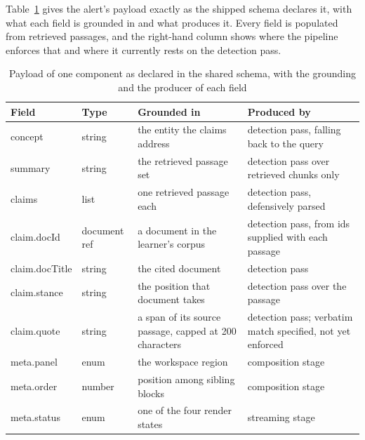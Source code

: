\documentclass[conference]{IEEEtran}
\newcommand{\tbl}{\footnotesize}
\begin{document}
Table~\ref{tab:payload} gives the alert's payload exactly as the shipped schema declares it, with what each field is grounded in and what produces it. Every field is populated from retrieved passages, and the right-hand column shows where the pipeline enforces that and where it currently rests on the detection pass.
\begin{table}[t]
\caption{Payload of one component as declared in the shared schema, with the grounding and the producer of each field}
\label{tab:payload}
\centering
\tbl
\begin{tabular}{@{}p{}p{}p{}p{}@{}}
\toprule
\textbf{Field} & \textbf{Type} & \textbf{Grounded in} & \textbf{Produced by} \\
\midrule
concept & string & the entity the claims address & detection pass, falling back to the query \\
summary & string & the retrieved passage set & detection pass over retrieved chunks only \\
claims & list & one retrieved passage each & detection pass, defensively parsed \\
claim.docId & document ref & a document in the learner's corpus & detection pass, from ids supplied with each passage \\
claim.docTitle & string & the cited document & detection pass \\
claim.stance & string & the position that document takes & detection pass over the passage \\
claim.quote & string & a span of its source passage, capped at 200 characters & detection pass; verbatim match specified, not yet enforced \\
meta.panel & enum & the workspace region & composition stage \\
meta.order & number & position among sibling blocks & composition stage \\
meta.status & enum & one of the four render states & streaming stage \\
\bottomrule
\end{tabular}
\end{table}
\end{document}
